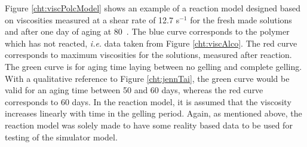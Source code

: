 \documentclass[energies,article,submit,moreauthors,pdftex]{Definitions/mdpi}
\begin{document}
Figure \ref{cht:viscPolcModel} shows an example of a reaction model designed based on viscosities measured at a shear rate of 12.7 s$^{-1}$ for the fresh made solutions and after one day of aging at 80~\celsius. The blue curve corresponds to the polymer which has not reacted, \textit{i.e.} data taken from Figure \ref{cht:viscAlco}. The red curve corresponds to maximum viscosities for the solutions, measured after reaction. The green curve is for aging time laying between no gelling and complete gelling. With a qualitative reference to Figure \ref{cht:jennTai}, the green curve would be valid for an aging time between 50 and 60 days, whereas the red curve corresponds to 60 days. In the reaction model, it is assumed that the viscosity increases linearly with time in the gelling period. Again, as mentioned above, the reaction model was solely made to have some reality based data to be used for testing of the simulator model. 
\end{document}
